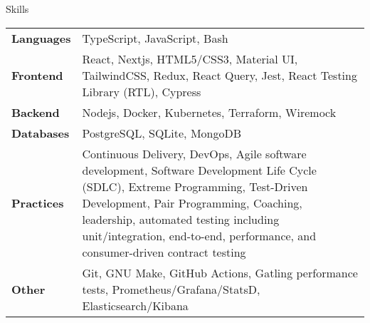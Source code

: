 \begin{section}{Skills}
  \begin{tabularx}{\linewidth}{@{}l X@{}}
    \textbf{Languages} &\small{TypeScript, JavaScript, Bash} \\
    \textbf{Frontend} &\small{React, Nextjs, HTML5/CSS3, Material UI, TailwindCSS, Redux, React Query, Jest, React Testing Library (RTL), Cypress} \\
    \textbf{Backend} &\small{Nodejs, Docker, Kubernetes, Terraform, Wiremock} \\
    \textbf{Databases} &\small{PostgreSQL, SQLite, MongoDB} \\
    \textbf{Practices} &\small{Continuous Delivery, DevOps, Agile software development, Software Development Life Cycle (SDLC), Extreme Programming, Test-Driven Development, Pair Programming, Coaching, leadership, automated testing including unit/integration, end-to-end, performance, and consumer-driven contract testing} \\
    \textbf{Other} &\small{Git, GNU Make, GitHub Actions, Gatling performance tests, Prometheus/Grafana/StatsD, Elasticsearch/Kibana} \\
  \end{tabularx}
\end{section}
